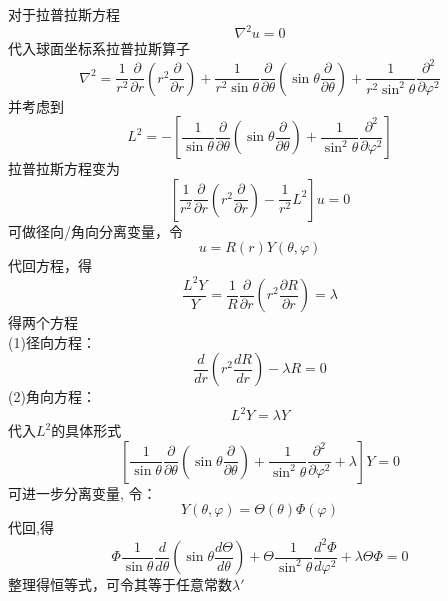 对于拉普拉斯方程 
$$ \nabla ^2 u = 0 $$	
代入球面坐标系拉普拉斯算子
$$ \displaystyle  \nabla ^{2} =\frac{1}{r^2} \frac{\partial }{\partial r} (r^2\frac{\partial }{\partial r} )+
	\frac{1}{r^2 \sin \theta  } \frac{\partial }{\partial \theta } (\sin \theta \frac{\partial }{\partial \theta } )
	+\frac{1}{r^2 \sin^2 \theta  } \frac{\partial^2}{\partial\varphi ^2}$$
并考虑到
\begin{equation*}
	L^2 =  -\left[ \frac{1}{ \sin \theta  } \frac{\partial }{\partial \theta } (\sin \theta \frac{\partial }{\partial \theta } )
	+\frac{1}{ \sin^2 \theta  } \frac{\partial^2}{\partial\varphi ^2} \right]
\end{equation*}	
拉普拉斯方程变为 
\begin{equation*}
	\left[\frac{1}{r^2}  \frac{\partial }{\partial r} (r^2\frac{\partial }{\partial r} ) - \frac{1}{r^2} L^2  \right] u
	=0
\end{equation*}	
可做径向/角向分离变量，令 
\begin{equation*}
	u=R (r) Y(\theta,\varphi)
\end{equation*}	
代回方程，得
\begin{equation*}
	\frac{ L^2 Y}{Y}= \frac{1}{R}   \frac{\partial }{\partial r} (r^2\frac{\partial R }{\partial r} )=\lambda
\end{equation*}
得两个方程	\\
(1)径向方程：
\begin{equation}\label{eq:r}
	\frac{d}{d r} (r^2\frac{d R }{d r} ) -\lambda R =0
\end{equation}	
(2)角向方程：
\begin{equation*}
	L^2 Y=\lambda Y
\end{equation*}	
代入$L^2$的具体形式
	\begin{equation*}
		\left[ \frac{1}{ \sin \theta  } \frac{\partial }{\partial \theta } (\sin \theta \frac{\partial }{\partial \theta } )
		+\frac{1}{ \sin^2 \theta  } \frac{\partial^2}{\partial\varphi ^2}  +\lambda \right] Y=0 
	\end{equation*}
    可进一步分离变量, 令：
	\begin{equation*}
		Y(\theta,\varphi)= \Theta(\theta) \Phi(\varphi)
	\end{equation*}	
	代回,得
	\begin{equation*}
		\Phi \frac{1}{\sin \theta} \frac{d}{d \theta}\left(\sin \theta \frac{d \Theta}{d \theta}\right)+\Theta \frac{1}{\sin ^{2} \theta} \frac{d^{2} \Phi}{d \varphi^{2}}+\lambda \Theta \Phi=0
	\end{equation*}	
	整理得恒等式，可令其等于任意常数$\lambda'$
